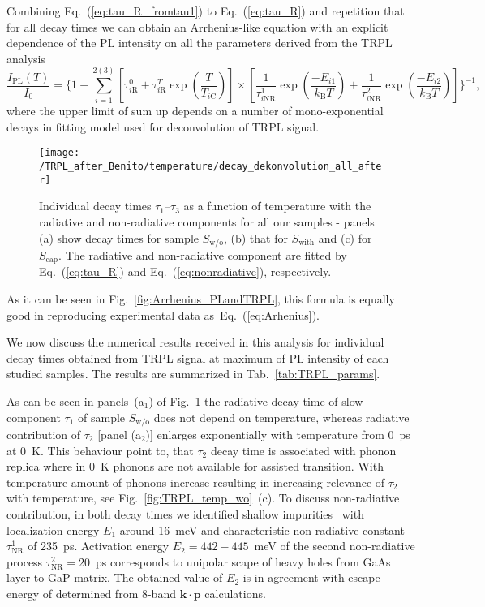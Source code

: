 Combining Eq.~(\ref{eq:tau_R_fromtau1}) to Eq.~(\ref{eq:tau_R}) and repetition that for all decay times we can obtain an Arrhenius-like equation with an explicit dependence of the PL intensity on all the parameters derived from the TRPL analysis
%
\begin{equation}
\frac{I_\mathrm{PL}(T)}{I_0}=\Bigg\{ 1+\sum_{i=1}^{2(3)} {\left[\tau_{i\mathrm{R}}^0+\tau_{i\mathrm{R}}^T\exp{\left(\frac{T}{T_{i\mathrm{C}}}\right)}\right] \times \left[\frac{1}{\tau_{i\mathrm{NR}}^1}\exp{\left(\frac{-E_{i1}}{k_\mathrm{B}T}\right)} + \frac{1}{\tau_{i\mathrm{NR}}^2}\exp{\left(\frac{-E_{i2}}{k_\mathrm{B}T}\right)}\right]}\Bigg\}^{-1}, \label{eq:TRPL_Arhenius}
\end{equation}
%
where the upper limit of sum up depends on a number of mono-exponential decays in fitting model used for deconvolution of TRPL signal.
\begin{figure}
	\centering
	\texttt{[image: /TRPL\_after\_Benito/temperature/decay\_dekonvolution\_all\_after]}
	\caption{Individual decay times $\tau_1$--$\tau_3$ as a function of temperature with the radiative and non-radiative components for all our samples - panels (a) show decay times for sample $S_\mathrm{w/o}$, (b) that for $S_\mathrm{with}$ and (c) for $S_\mathrm{cap}$. The radiative and non-radiative component are fitted by Eq.~(\ref{eq:tau_R}) and Eq.~(\ref{eq:nonradiative}), respectively.}
	\label{fig:TRPL_temp_decon}
\end{figure}

As it can be seen in Fig.~\ref{fig:Arrhenius_PLandTRPL}, this formula is equally good in reproducing experimental data as~Eq.~(\ref{eq:Arhenius}). 


\newpage

We now discuss the numerical results received in this analysis for individual decay times obtained from TRPL signal at maximum of PL intensity of each studied samples. The results are summarized in Tab.~\ref{tab:TRPL_params}. 

As can be seen in panels~(a$_1$) of Fig.~\ref{fig:TRPL_temp_decon} the radiative decay time of slow component $\tau_1$ of sample $S_\mathrm{w/o}$ does not depend on temperature, whereas radiative contribution of $\tau_2$ [panel (a$_2$)] enlarges exponentially with temperature from 0~ps at 0~K. This behaviour point to, that $\tau_2$ decay time is associated with phonon replica where in 0~K phonons are not available for assisted transition. With temperature amount of phonons increase resulting in increasing relevance of $\tau_2$ with temperature, see Fig.~\ref{fig:TRPL_temp_wo}~(c). To discuss non-radiative contribution, in both decay times we identified shallow impurities~\citep{Cardona} with localization energy $E_1$ around 16~meV and characteristic non-radiative constant $\tau^1_\mathrm{NR}$ of 235~ps. Activation energy $E_2=442-445$~meV of the second non-radiative process $\tau^2_\mathrm{NR}=20$~ps corresponds to unipolar scape of heavy holes from GaAs layer to GaP matrix. The obtained value of $E_2$ is in agreement with escape energy of {\color{green}{VALUE ještě jednou změřit v pythonu unikovou energii HH pro 5ML vrstvu}} determined from 8-band $\mathbf{k\cdot p}$ calculations.

